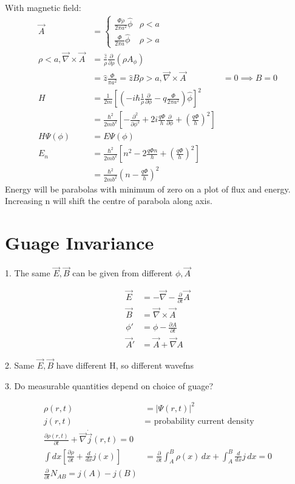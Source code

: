 \documentclass[a4paper, 11pt, normalem]{report}
\begin{document}
With magnetic field:
\begin{align}
    \vec{A} &= \begin{cases} \frac{\Phi\dot\rho}{2\pi a^2}\hat{\phi} & \rho < a \\ \frac{\Phi}{2\pi a}\hat{\phi} & \rho > a \end{cases} \\
    \rho < a, \vec{\nabla}\times\vec{A} &= \frac{\hat{z}}{\rho} \frac{\partial}{\partial \rho}(\rho A_\phi) \\
    &= \hat{z}\frac{\Phi}{\pi a^2} = \hat{z}B
    \rho > a, \vec{\nabla}\times\vec{A} &= 0 \implies B = 0 \\
    H &= \frac{1}{2m}\left[\left(-i\hbar\frac{1}{\rho}\frac{\partial}{\partial\phi} - q\frac{\Phi}{2\pi a^2}\right)\hat{\phi}\right]^2 \\
    &= \frac{\hbar^2}{2mb^2}\left[-\frac{\partial^2}{\partial\phi^2} + 2i\frac{q\Phi}{h}\frac{\partial}{\partial\phi} + \left(\frac{q\Phi}{h}\right)^2\right] \\
    H\Psi(\phi) &= E\Psi(\phi) \\
    E_n &= \frac{\hbar^2}{2mb^2}\left[n^2 - 2\frac{q\Phi n}{h} + \left(\frac{q\Phi}{h}\right)^2\right] \\
    &= \frac{\hbar^2}{2mb^2}\left(n - \frac{q\Phi}{h}\right)^2
\end{align}
Energy will be parabolas with minimum of zero on a plot of flux and energy.
Increasing n will shift the centre of parabola along axis.

\section{Guage Invariance}

1. The same $\vec{E},\vec{B}$ can be given from different $\phi,\vec{A}$

\begin{align}
    \vec{E} &= -\vec{\nabla} - \frac{\partial}{\partial t}\vec{A} \\
    \vec{B} &= \vec{\nabla}\times\vec{A} \\
    \phi' &= \phi - \frac{\partial A}{\partial t} \\
    \vec{A}' &= \vec{A} + \vec{\nabla}A
\end{align}

2. Same $\vec{E},\vec{B}$ have different H, so different wavefns

3. Do measurable quantities depend on choice of guage?

\begin{align}
    \rho(r,t) &= |\Psi(r,t)|^2 \\
    j(r,t) &= \text{ probability current density} \\
    \frac{\partial\rho(r,t)}{\partial t} + \vec{\nabla}\dot\vec{j}(r,t) = 0 \\
    \int dx \left[\frac{\partial\rho}{\partial t} + \frac{d}{dx}j(x)\right] &= \frac{\partial}{\partial t} \int_A^B \rho(x)\,dx + \int_A^B \frac{d}{dx}j\,dx = 0 \\
    \frac{\partial}{\partial t}N_{AB} = j(A) - j(B)
\end{align}
\end{document}
